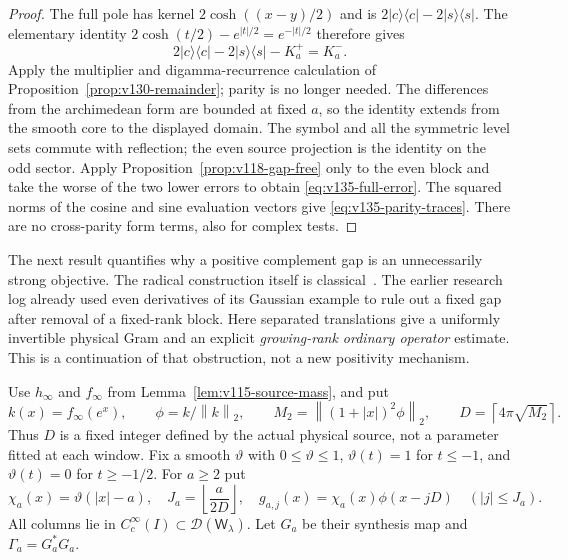 \documentclass[11pt]{article}
\theoremstyle{remark}
\newcommand{\norm}[1]{\left\lVert #1\right\rVert}
\begin{document}
\begin{proof}
The full pole has kernel $2\cosh((x-y)/2)$ and is
$2|c\rangle\langle c|-2|s\rangle\langle s|$.  The elementary
identity $2\cosh(t/2)-e^{|t|/2}=e^{-|t|/2}$ therefore gives
\[
 2|c\rangle\langle c|-2|s\rangle\langle s|-K_a^+=K_a^-.
\]
Apply the multiplier and digamma-recurrence calculation of
Proposition~\ref{prop:v130-remainder}; parity is no longer needed.
The differences from the archimedean form are bounded at fixed $a$,
so the identity extends from the smooth core to the displayed domain.
The symbol and all the symmetric level sets commute with reflection;
the even source projection is the identity on the odd sector.
Apply Proposition~\ref{prop:v118-gap-free} only to the even block and
take the worse of the two lower errors to obtain
\eqref{eq:v135-full-error}.  The squared norms of the cosine and sine
evaluation vectors give \eqref{eq:v135-parity-traces}.  There are no
cross-parity form terms, also for complex tests.
\end{proof}

The next result quantifies why a positive complement gap is an
unnecessarily strong objective.  The radical construction itself is
classical~\cite[Section 3]{ConnesConsani2023}.  The earlier research
log already used even derivatives of its Gaussian example to rule out
a fixed gap after removal of a fixed-rank block.  Here separated
translations give a uniformly invertible physical Gram and an explicit
\emph{growing-rank ordinary operator} estimate.  This is a continuation
of that obstruction, not a new positivity mechanism.

Use $h_\infty$ and $f_\infty$ from
Lemma~\ref{lem:v115-source-mass}, and put
\[
 k(x)=f_\infty(e^x),\qquad \phi=k/\norm k_2,\qquad
 M_2=\norm{(1+|x|)^2\phi}_2,\qquad
 D=\left\lceil4\pi\sqrt{M_2}\right\rceil.
\]
Thus $D$ is a fixed integer defined by the actual physical source,
not a parameter fitted at each window.  Fix a smooth $\vartheta$ with
$0\le\vartheta\le1$, $\vartheta(t)=1$ for $t\le-1$, and
$\vartheta(t)=0$ for $t\ge-1/2$.  For $a\ge2$ put
\[
 \chi_a(x)=\vartheta(|x|-a),\quad
 J_a=\left\lfloor\frac{a}{2D}\right\rfloor,\quad
 g_{a,j}(x)=\chi_a(x)\phi(x-jD)\quad(|j|\le J_a).
\]
All columns lie in $C_c^\infty(I)\subset\mathcal D(\mathsf W_\lambda)$.
Let $G_a$ be their synthesis map and $\Gamma_a=G_a^*G_a$.
\end{document}
